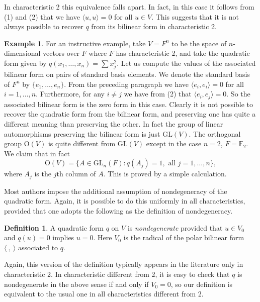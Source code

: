 \documentclass[12pt,oneside]{amsart}
\theoremstyle{definition}
\newtheorem*{defn*}{Definition}
\newtheorem*{example*}{Example}
\theoremstyle{remark}
\newcommand{\F}{{\mathbb F}}
\newcommand{\GL}{\mathrm{GL}}
\renewcommand{\O}{\mathrm{O}}
\newcommand{\inner}[2]{\langle #1, #2 \rangle}
\begin{document}
In characteristic 2 this equivalence falls apart.  In fact, in this
case it follows from (1) and (2) that we have $\inner{u}{u} = 0$ for
all $u \in V$. This suggests that it is not always possible to recover
$q$ from its bilinear form in characteristic 2.

\begin{example*}
For an instructive example, take $V = F^n$ to be the space of
$n$-dimensional vectors over $F$ where $F$ has characteristic 2, and
take the quadratic form given by $q(x_1, \dots, x_n) = \sum
x_j^2$. Let us compute the values of the associated bilinear form on
pairs of standard basis elements. We denote the standard basis of
$F^n$ by $\{ e_1, \dots, e_n\}$. From the preceding paragraph we have
$\inner{e_i}{e_i} = 0$ for all $i = 1, \dots, n$. Furthermore, for any
$i \ne j$ we have from (2) that $\inner{e_i}{e_j} = 0$. So the
associated bilinear form is the zero form in this case. Clearly it is
not possible to recover the quadratic form from the bilinear form, and
preserving one has quite a different meaning than preserving the
other. In fact the group of linear automorphisms preserving the
bilinear form is just $\GL(V)$.  The orthogonal group $\O(V)$ is quite
different from $\GL(V)$ except in the case $n=2$, $F=\F_2$. We claim
that in fact 
\[
  \O(V) = \{ A \in \GL_n(F) \colon q(A_j) = 1, \text{ all } j =1,
  \dots, n \},
\]
where $A_j$ is the $j$th column of $A$. This is proved by a simple
calculation.
\end{example*}

Most authors impose the additional assumption of nondegeneracy of the
quadratic form. Again, it is possible to do this uniformly in all
characteristics, provided that one adopts the following as the
definition of nondegeneracy.

\begin{defn*}
  A quadratic form $q$ on $V$ is \emph{nondegenerate} provided that $u
  \in V_0$ and $q(u)=0$ implies $u=0$. Here $V_0$ is the radical of
  the polar bilinear form $\inner{\ }{\ }$ associated to $q$.
\end{defn*}

Again, this version of the definition typically appears in the
literature only in characteristic 2. In characteristic different from
2, it is easy to check that $q$ is nondegenerate in the above sense if
and only if $V_0=0$, so our definition is equivalent to the usual one
in all characteristics different from 2. 
\end{document}
